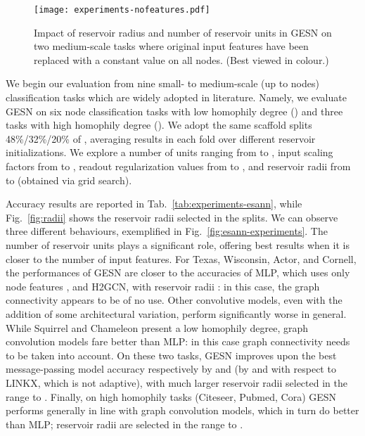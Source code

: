 \documentclass[final,5p,times,twocolumn]{elsarticle}
\begin{document}
\begin{figure*}
	\centering
	\texttt{[image: experiments-nofeatures.pdf]}
	\caption{Impact of reservoir radius and number of reservoir units in GESN on two medium-scale tasks where original input features have been replaced with a constant value on all nodes. (Best viewed in colour.)}
	\label{fig:esann-no-features}
\end{figure*}

We begin our evaluation from nine small- to medium-scale (up to  nodes) classification tasks which are widely adopted in literature.
Namely, we evaluate GESN on six node classification tasks with low homophily degree () and three tasks with high homophily degree ().
We adopt the same  scaffold splits 48\%/32\%/20\% of \cite{Zhu2020}, averaging results in each fold over  different reservoir initializations.
We explore a number of units ranging from  to , input scaling factors from  to , readout regularization values from  to , and reservoir radii  from  to  (obtained via grid search).

Accuracy results are reported in Tab.~\ref{tab:experiments-esann}, while Fig.~\ref{fig:radii} shows the reservoir radii selected in the  splits.
We can observe three different behaviours, exemplified in Fig.~\ref{fig:esann-experiments}.
The number of reservoir units plays a significant role, offering best results when it is closer to the number of input features.
For Texas, Wisconsin, Actor, and Cornell, the performances of GESN are closer to the accuracies of MLP, which uses only node features , and H2GCN, with reservoir radii : in this case, the graph connectivity appears to be of no use.
Other convolutive models, even with the addition of some architectural variation, perform significantly worse in general.
While Squirrel and Chameleon present a low homophily degree, graph convolution models fare better than MLP: in this case graph connectivity needs to be taken into account.
On these two tasks, GESN improves upon the best message-passing model accuracy respectively by  and  (by  and  with respect to LINKX, which is not adaptive), with much larger reservoir radii selected in the range  to .
Finally, on high homophily tasks (Citeseer, Pubmed, Cora) GESN performs generally in line with graph convolution models, which in turn do better than MLP; reservoir radii are selected in the range  to .
\end{document}
